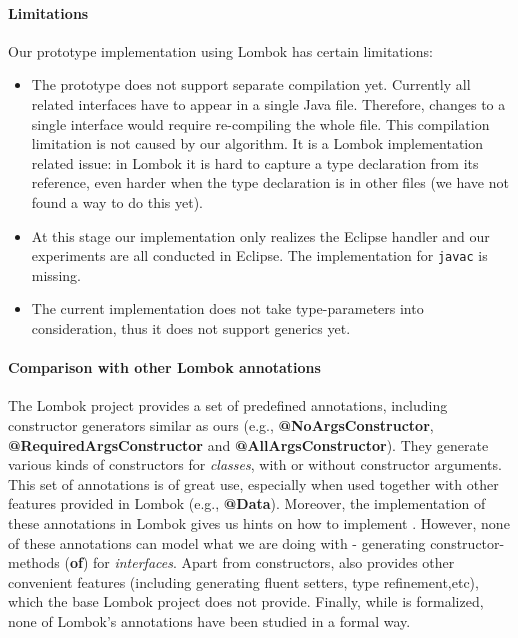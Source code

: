 \paragraph{Limitations}
Our prototype implementation using Lombok has certain limitations: 
\begin{itemize}
\item The prototype does not support separate compilation yet. Currently all
  related interfaces have to appear in a single Java file. Therefore, changes to
  a single interface would require re-compiling the whole file. This compilation
  limitation is not caused by our algorithm. It is a Lombok implementation related
  issue: in Lombok it is hard to capture a type declaration from its reference,
  even harder when the type declaration is in other files (we have not found a
  way to do this yet).
\item At this stage our implementation only realizes the Eclipse handler and our
  experiments are all conducted in Eclipse. The implementation for
  \texttt{javac} is missing.
\item The current implementation does not take type-parameters into
  consideration, thus it does not support generics yet.
\end{itemize}

\paragraph{Comparison with other Lombok annotations}
The Lombok project provides a set of predefined annotations, including constructor
generators similar as ours (e.g., \textbf{@NoArgsConstructor},
\textbf{@RequiredArgsConstructor} and \textbf{@AllArgsConstructor}). They
generate various kinds of constructors for \emph{classes}, with or without
constructor arguments. This set of annotations is of great use, especially when
used together with other features provided in Lombok (e.g.,
\textbf{@Data}). Moreover, the implementation of these annotations in Lombok
gives us hints on how to implement \mixin. However, none of these annotations
can model what we are doing with \mixin - generating constructor-methods
(\textbf{of}) for \emph{interfaces}. Apart from constructors, \mixin also
provides other convenient features (including generating fluent setters, type
refinement,etc), which the base Lombok project does not provide. 
Finally, while \mixin is formalized, none of Lombok's annotations have been 
studied in a formal way. 

